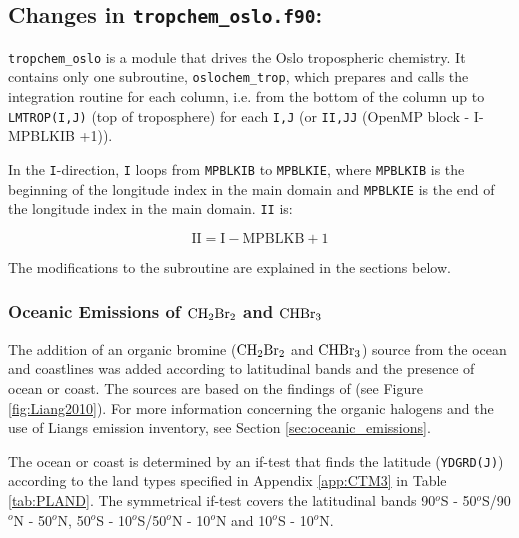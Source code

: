 \subsection{Changes in \texttt{tropchem\_oslo.f90}:}\label{sec:tropchem_oslo}

\texttt{tropchem\_oslo} is a module that drives the Oslo tropospheric chemistry. It contains only one subroutine, \texttt{oslochem\_trop}, which prepares and calls the integration routine for each column, i.e. from the bottom of the column up to \texttt{LMTROP(I,J)} (top of troposphere) for each \texttt{I,J} (or \texttt{II,JJ} (OpenMP block - I-MPBLKIB +1)). 

\medskip

In the \texttt{I}-direction, \texttt{I} loops from \texttt{MPBLKIB} to \texttt{MPBLKIE}, where \texttt{MPBLKIB} is the beginning of the longitude index in the main domain and \texttt{MPBLKIE} is the end of the longitude index in the main domain. \texttt{II} is: 

\begin{equation*}
    \text{II} = \text{I} - \text{MPBLKB} + 1
\end{equation*}

\medskip

The modifications to the subroutine are explained in the sections below.


\subsubsection{Oceanic Emissions of $\mathrm{CH_2Br_2}$ and $\mathrm{CHBr_3}$}\label{sec:impl_ocean_source}

The addition of an organic bromine ($\mathrm{CH_2Br_2}$ and $\mathrm{CHBr_3}$) source from the ocean and coastlines was added according to latitudinal bands and the presence of ocean or coast. The sources are based on the findings of \cite{Liang2010} (see Figure \ref{fig:Liang2010}). For more information concerning the organic halogens and the use of Liangs emission inventory, see Section \ref{sec:oceanic_emissions}.

\medskip

The ocean or coast is determined by an if-test that finds the latitude (\texttt{YDGRD(J)}) according to the land types specified in Appendix \ref{app:CTM3} in Table \ref{tab:PLAND}. The symmetrical if-test covers the latitudinal bands 90$^o$S - 50$^o$S/90$^o$N - 50$^o$N, 50$^o$S - 10$^o$S/50$^o$N - 10$^o$N and 10$^o$S - 10$^o$N. 

\medskip

